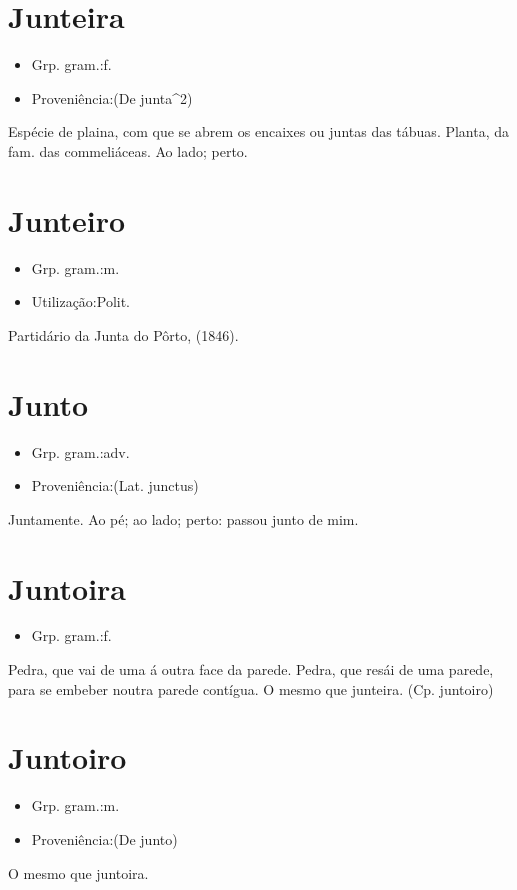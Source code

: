 \documentclass{article}
\begin{document}
\section{Junteira}
\begin{itemize}
\item {Grp. gram.:f.}
\end{itemize}
\begin{itemize}
\item {Proveniência:(De \textunderscore junta\textunderscore ^2)}
\end{itemize}
Espécie de plaina, com que se abrem os encaixes ou juntas das tábuas.
Planta, da fam. das commeliáceas.
Ao lado; perto.
\section{Junteiro}
\begin{itemize}
\item {Grp. gram.:m.}
\end{itemize}
\begin{itemize}
\item {Utilização:Polit.}
\end{itemize}
Partidário da Junta do Pôrto, (1846).
\section{Junto}
\begin{itemize}
\item {Grp. gram.:adv.}
\end{itemize}
\begin{itemize}
\item {Proveniência:(Lat. \textunderscore junctus\textunderscore )}
\end{itemize}
Juntamente.
Ao pé; ao lado; perto: \textunderscore passou junto de mim\textunderscore .
\section{Juntoira}
\begin{itemize}
\item {Grp. gram.:f.}
\end{itemize}
Pedra, que vai de uma á outra face da parede.
Pedra, que resái de uma parede, para se embeber noutra parede contígua.
O mesmo que \textunderscore junteira\textunderscore .
(Cp. \textunderscore juntoiro\textunderscore )
\section{Juntoiro}
\begin{itemize}
\item {Grp. gram.:m.}
\end{itemize}
\begin{itemize}
\item {Proveniência:(De \textunderscore junto\textunderscore )}
\end{itemize}
O mesmo que \textunderscore juntoira\textunderscore .
\end{document}
